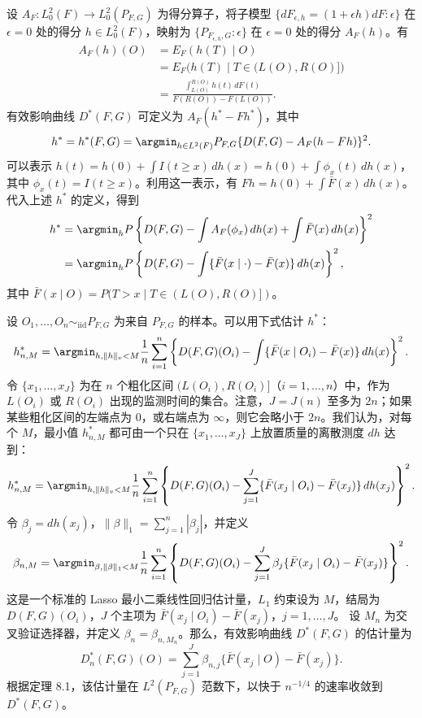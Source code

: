设 $A_F:L_0^2(F)\to L_0^2(P_{F,G})$ 为得分算子，将子模型
$\{dF_{\epsilon,h}=(1+\epsilon h)dF:\epsilon\}$
在 $\epsilon=0$ 处的得分 $h\in L_0^2(F)$，映射为
$\{P_{F_{\epsilon,h},G}:\epsilon\}$
在 $\epsilon=0$ 处的得分 $A_F(h)$。有
\[
 \begin{aligned}
 A_F(h)(O)&=E_F(h(T)\mid O)\\
 &=E_F\bigl(h(T)\mid T\in(L(O),R(O)]\bigr)\\
 &=\frac{\int_{L(O)}^{R(O)}h(t)\,dF(t)}
 {F(R(O))-F(L(O))}.
 \end{aligned}
\]
有效影响曲线 $D^*(F,G)$ 可定义为 $A_F(h^*-Fh^*)$，其中
\[
 h^*=h^*(F,G)=\argmin_{h\in L^2(F)}
 P_{F,G}\{D(F,G)-A_F(h-Fh)\}^2.
\]
可以表示
$h(t)=h(0)+\int I(t\geq x)\,dh(x)=h(0)+\int\phi_x(t)\,dh(x)$，
其中 $\phi_x(t)=I(t\geq x)$。利用这一表示，有
$Fh=h(0)+\int\bar F(x)\,dh(x)$。
代入上述 $h^*$ 的定义，得到
\[
 \begin{aligned}
 h^*&=\argmin_h P\left\{D(F,G)-\int A_F(\phi_x)\,dh(x)
 +\int\bar F(x)\,dh(x)\right\}^2\\
 &=\argmin_h P\left\{D(F,G)-\int
 \{\bar F(x\mid\cdot)-\bar F(x)\}\,dh(x)\right\}^2,
 \end{aligned}
\]
其中 $\bar F(x\mid O)=P(T>x\mid T\in(L(O),R(O)])$。

设 $O_1,\ldots,O_n\sim_{\mathrm{iid}}P_{F,G}$ 为来自 $P_{F,G}$ 的样本。可以用下式估计 $h^*$：
\[
 h_{n,M}^*=\argmin_{h,\|h\|_v<M}\frac1n\sum_{i=1}^n
 \left\{D(F,G)(O_i)-\int
 \{\bar F(x\mid O_i)-\bar F(x)\}\,dh(x)\right\}^2.
\]
令 $\{x_1,\ldots,x_J\}$ 为在 $n$ 个粗化区间
$(L(O_i),R(O_i)]$（$i=1,\ldots,n$）中，作为 $L(O_i)$ 或 $R(O_i)$ 出现的监测时间的集合。注意，$J=J(n)$ 至多为 $2n$；如果某些粗化区间的左端点为 0，或右端点为 $\infty$，则它会略小于 $2n$。我们认为，对每个 $M$，最小值 $h_{n,M}^*$ 都可由一个只在 $\{x_1,\ldots,x_J\}$ 上放置质量的离散测度 $dh$ 达到：
\[
 h_{n,M}^*=\argmin_{h,\|h\|_v<M}\frac1n\sum_{i=1}^n
 \left\{D(F,G)(O_i)-\sum_{j=1}^J
 \{\bar F(x_j\mid O_i)-\bar F(x_j)\}\,dh(x_j)\right\}^2.
\]
令 $\beta_j=dh(x_j)$，$\|\beta\|_1=\sum_{j=1}^n|\beta_j|$，并定义
\[
 \beta_{n,M}=\argmin_{\beta,\|\beta\|_1<M}\frac1n\sum_{i=1}^n
 \left\{D(F,G)(O_i)-\sum_{j=1}^J
 \beta_j\{\bar F(x_j\mid O_i)-\bar F(x_j)\}\right\}^2.
\]
这是一个标准的 Lasso 最小二乘线性回归估计量，$L_1$ 约束设为 $M$，结局为 $D(F,G)(O_i)$，$J$ 个主项为
$\bar F(x_j\mid O_i)-\bar F(x_j)$，$j=1,\ldots,J$。
设 $M_n$ 为交叉验证选择器，并定义 $\beta_n=\beta_{n,M_n}$。那么，有效影响曲线 $D^*(F,G)$ 的估计量为
\[
 D_n^*(F,G)(O)=\sum_{j=1}^J
 \beta_{n,j}\{\bar F(x_j\mid O)-\bar F(x_j)\}.
\]
根据定理 8.1，该估计量在 $L^2(P_{F,G})$ 范数下，以快于 $n^{-1/4}$ 的速率收敛到 $D^*(F,G)$。
